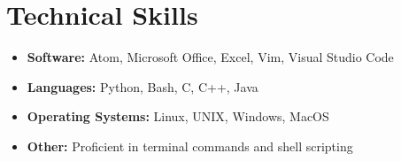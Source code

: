 \documentclass[10pt]{article}
\begin{document}
\section{Technical Skills}

\begin{itemize}
  \item \textbf{Software:} Atom, Microsoft Office, Excel, Vim, Visual Studio Code
  \item \textbf{Languages:} Python, Bash, C, C++, Java
  \item \textbf{Operating Systems:} Linux, UNIX, Windows, MacOS
  \item \textbf{Other:} Proficient in terminal commands and shell scripting
\end{itemize}
\end{document}
